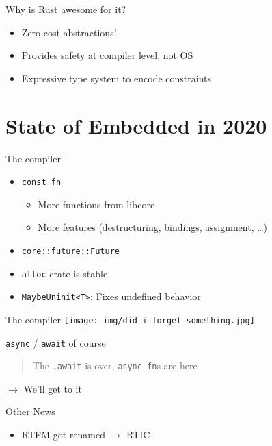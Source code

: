 \documentclass[aspectratio=1610,14pt,t]{beamer}
\begin{document}
\begin{frame}[c]{Why is Rust awesome for it?}
  \begin{itemize}
    \item Zero cost abstractions!
    \item Provides safety at compiler level, not OS
    \item Expressive type system to encode constraints
  \end{itemize}
\end{frame}

\section{State of Embedded in 2020}
\begin{frame}[c]{The compiler}
  \begin{itemize}
    \item \texttt{const fn}
      \begin{itemize}
        \item More functions from libcore
        \item More features (destructuring, bindings, assignment, \ldots)
      \end{itemize}
    \item \texttt{core::future::Future}
    \item \texttt{alloc} crate is stable
    \item \texttt{MaybeUninit<T>}: Fixes undefined behavior
  \end{itemize}
\end{frame}

\begin{frame}[c]{The compiler}
  \texttt{[image: img/did-i-forget-something.jpg]}
\end{frame}

\begin{frame}[c]{\texttt{async} / \texttt{await} of course}

  \begin{quote}
    The \texttt{.await} is over, \texttt{async fn}s are here
  \end{quote}

  $\rightarrow$ We'll get to it
\end{frame}

\begin{frame}[c]{Other News}
  \begin{itemize}
    \item RTFM got renamed $\rightarrow$ RTIC
  \end{itemize}
\end{frame}
\end{document}
